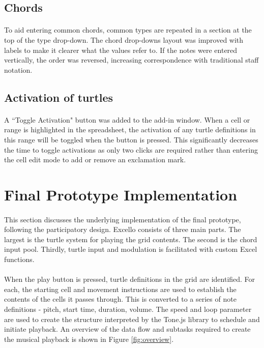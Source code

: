 \subsection{Chords}

\paragraph{} To aid entering common chords, common types are repeated in a section at the top of the type drop-down. The chord drop-downs layout was improved with labels to make it clearer what the values refer to. If the notes were entered vertically, the order was reversed, increasing correspondence with traditional staff notation.

\subsection{Activation of turtles}

\paragraph{} A ``Toggle Activation" button was added to the add-in window. When a cell or range is highlighted in the spreadsheet, the activation of any turtle definitions in this range will be toggled when the button is pressed.  This significantly decreases the time to toggle activations as only two clicks are required rather than entering the cell edit mode to add or remove an exclamation mark.

\section{Final Prototype Implementation}

\paragraph{} This section discusses the underlying implementation of the final prototype, following the participatory design. Excello consists of three main parts. The largest is the turtle system for playing the grid contents. The second is the chord input pool. Thirdly, turtle input and modulation is facilitated with custom Excel functions.

\paragraph{} When the play button is pressed, turtle definitions in the grid are identified. For each, the starting cell and movement instructions are used to establish the contents of the cells it passes through. This is converted to a series of note definitions - pitch, start time, duration, volume. The speed and loop parameter are used to create the structure interpreted by the Tone.js library to schedule and initiate playback. An overview of the data flow and subtasks required to create the musical playback is shown in Figure \ref{fig:overview}.

